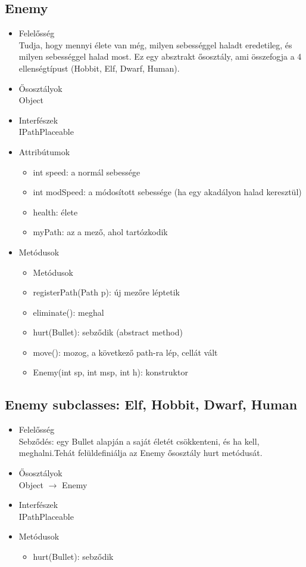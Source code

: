 \subsection{Enemy}
\begin{itemize}
\item Felelősség\\
Tudja, hogy mennyi élete van még, milyen sebességgel haladt eredetileg, és milyen sebességgel halad most. Ez egy absztrakt ősosztály, ami összefogja a 4 ellenségtípust (Hobbit, Elf, Dwarf, Human).
\item Ősosztályok\\
Object
\item Interfészek\\
IPathPlaceable
\item Attribútumok%
	\begin{itemize}
		\item int speed: a normál sebessége
		\item int modSpeed: a módosított sebessége (ha egy akadályon halad keresztül)
		\item health: élete
		\item myPath: az a mező, ahol tartózkodik
	\end{itemize}
\item Metódusok
	\begin{itemize}
		\item Metódusok
		\item registerPath(Path p): új mezőre léptetik
		\item eliminate(): meghal
		\item hurt(Bullet): sebződik (abstract method)
		\item move(): mozog, a következő path-ra lép, cellát vált
		\item Enemy(int sp, int msp, int h): konstruktor
		
		
	\end{itemize}
\end{itemize}

\subsection{Enemy subclasses: Elf, Hobbit, Dwarf, Human}
\begin{itemize}
\item Felelősség\\
Sebződés: egy Bullet alapján a saját életét csökkenteni, és ha kell, meghalni.Tehát felüldefiniálja az Enemy ősosztály hurt metódusát.
\item Ősosztályok\\
Object $\rightarrow$ Enemy
\item Interfészek\\
IPathPlaceable

\item Metódusok
	\begin{itemize}
		\item hurt(Bullet): sebződik
		
	\end{itemize}
\end{itemize}


